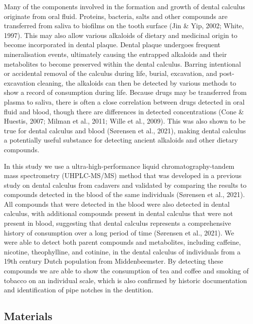 \documentclass[
]{article}
\begin{document}
Many of the components involved in the formation and growth of dental
calculus originate from oral fluid. Proteins, bacteria, salts and other
compounds are transferred from saliva to biofilms on the tooth surface
(Jin \& Yip, 2002; White, 1997). This may also allow various alkaloids
of dietary and medicinal origin to become incorporated in dental plaque.
Dental plaque undergoes frequent mineralisation events, ultimately
causing the entrapped alkaloids and their metabolites to become
preserved within the dental calculus. Barring intentional or accidental
removal of the calculus during life, burial, excavation, and
post-excavation cleaning, the alkaloids can then be detected by various
methods to show a record of consumption during life. Because drugs may
be transferred from plasma to saliva, there is often a close correlation
between drugs detected in oral fluid and blood, though there are
differences in detected concentrations (Cone \& Huestis, 2007; Milman et
al., 2011; Wille et al., 2009). This was also shown to be true for
dental calculus and blood (Sørensen et al., 2021), making dental
calculus a potentially useful substance for detecting ancient alkaloids
and other dietary compounds.

In this study we use a ultra-high-performance liquid
chromatography-tandem mass spectrometry (UHPLC-MS/MS) method that was
developed in a previous study on dental calculus from cadavers and
validated by comparing the results to compounds detected in the blood of
the same individuals (Sørensen et al., 2021). All compounds that were
detected in the blood were also detected in dental calculus, with
additional compounds present in dental calculus that were not present in
blood, suggesting that dental calculus represents a comprehensive
history of consumption over a long period of time (Sørensen et al.,
2021). We were able to detect both parent compounds and metabolites,
including caffeine, nicotine, theophylline, and cotinine, in the dental
calculus of individuals from a 19th century Dutch population from
Middenbeemster. By detecting these compounds we are able to show the
consumption of tea and coffee and smoking of tobacco on an individual
scale, which is also confirmed by historic documentation and
identification of pipe notches in the dentition.

\hypertarget{materials}{%
\subsection{Materials}\label{materials}}
\end{document}
